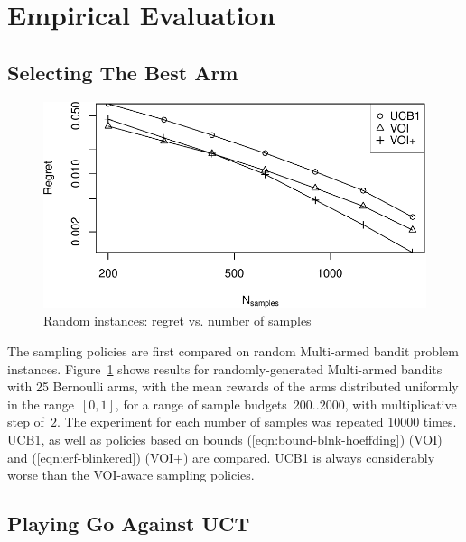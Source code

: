 \documentclass[]{article}
\begin{document}
\section{Empirical Evaluation}
\label{sec:empirical-evaluation}

\subsection{Selecting The Best Arm}
\label{sec:emp-arm}

\begin{figure}[h!]
\centering
\includegraphics[scale=0.6]{flat.pdf}
\caption{Random instances: regret vs. number of samples}
\label{fig:random-instances}
\end{figure}

The sampling policies are first compared on random Multi-armed bandit 
problem instances. Figure~\ref{fig:random-instances} shows results for
randomly-generated Multi-armed bandits with 25 Bernoulli arms, with
the mean rewards of the arms distributed uniformly in the range~$[0,
  1]$, for a range of sample budgets~$200..2000$, with multiplicative
step of~$2$. The experiment for each number of samples was repeated
10000 times. UCB1, as well as policies  based on bounds
(\ref{eqn:bound-blnk-hoeffding}) (VOI) and
(\ref{eqn:erf-blinkered}) (VOI+) are compared. UCB1 is always considerably worse than the
VOI-aware sampling policies.

\subsection{Playing Go Against UCT}
\label{sec:emp-go}
\end{document}
